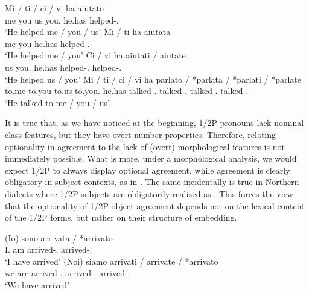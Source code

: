 \documentclass[output=paper]{langsci/langscibook}
\begin{document}
\ea\label{ex:06.2} 
   	\ea
	\gll    Mi / ti / ci / vi  ha aiutato\\
            me {} you {} us {} you.\Pl{}  he.has  helped-\M.\Sg{}\\
	\glt    ‘He helped me / you / us’
 	\ex
	\gll    Mi / ti      ha   aiutata\\
            me {} you   he.has   helped-\glossF.\Sg{}\\
	\glt    ‘He helped me / you’
 	\ex
	\gll    Ci / vi       ha   aiutati / aiutate\\
            us {} you.\Pl{}  he.has helped-\M.\Pl{} {} helped-\glossF.\Pl{}\\
	\glt    ‘He helped us / you’
    \ex
    \gll    Mi / ti / ci / vi    ha parlato / *parlata / *parlati / *parlate\\
    to.me {} to.you {} to.us {} to.you.\Pl{} he.has talked-\M.\Sg{} {}
    \hphantom{*}talked-\glossF.\Sg{} {} \hphantom{*}talked-\M.\Pl{} {}
    \hphantom{*}talked-\glossF.\Pl{}\\
    \glt    ‘He talked to me / you / us’
    \z
\z

It is true that, as we have noticed at the beginning, 1/2P pronouns lack
nominal class features, but they have overt number properties. Therefore,
relating optionality in agreement to the lack of (overt) morphological features
is not immediately possible. What is more, under a morphological analysis, we
would expect 1/2P to always display optional agreement, while agreement is
clearly obligatory in subject contexts, as in . The same
incidentally is true in Northern  dialects where 1/2P subjects are
obligatorily realized as . This forces the view that the optionality of
1/2P object agreement depends not on the lexical content of the 1/2P forms, but
rather on their structure of embedding.

\ea%
    \label{ex:06.3}
    \ea
	\gll    (Io\textsubscript{\glossF})   sono  arrivata / *arrivato\\
            \hphantom{(}I.\glossF{} am  arrived-\glossF.\Sg{} {} \hphantom{*}arrived-\M.\Sg{}\\
	\glt    ‘I have arrived’
 	\ex
    \gll    (Noi) siamo arrivati / arrivate / *arrivato\\
    \hphantom{(}we  are   arrived-\M.\Pl{} {} arrived-\glossF.\Pl{} {}
    \hphantom{*}arrived-\M.\Sg{}\\
    \glt    ‘We have arrived’
    \z
\z
\end{document}
